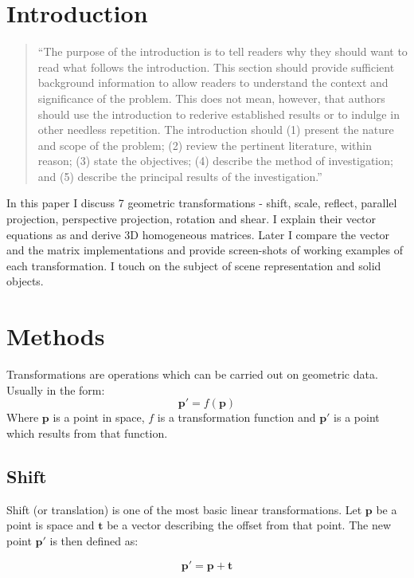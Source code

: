 \documentclass[]{report}   %
\begin{document}
\chapter{Introduction}		%


\begin{quotation}
	``The purpose of the introduction is to tell readers why they should want to read what follows the introduction.
	This section should provide sufficient background information to allow readers to understand the context and
	significance of the problem. This does not mean, however, that authors should use the introduction to rederive
	established results or to indulge in other needless repetition. The introduction should (1) present the nature
	and scope of the problem; (2) review the pertinent literature, within reason; (3) state the objectives; (4)
	describe the method of investigation; and (5) describe the principal results of the investigation.''
\end{quotation}


In this paper I discuss 7 geometric transformations - shift, scale, reflect, parallel projection, perspective projection, rotation and shear. I explain their vector equations as and derive 3D homogeneous matrices. Later I compare the vector and the matrix implementations and provide screen-shots of working examples of each transformation. I touch on the subject of scene representation and solid objects.





\chapter{Methods}           %


Transformations are operations which can be carried out on geometric data. Usually in the form:
\[
	\mathbf{p\prime} = f(\mathbf{p})
\]
Where \(\mathbf{p}\) is a point in space, \(f\) is a transformation function and \(\mathbf{p\prime}\) is a point which results from that function.


\section{Shift}

Shift (or translation) is one of the most basic linear transformations. Let \(\mathbf{p}\) be a point is space and \(\mathbf{t}\) be a vector describing the offset from that point. The new point \(\mathbf{p\prime}\) is then defined as:
\begin{mdframed}
\[
	\mathbf{p\prime} = \mathbf{p} + \mathbf{t}
\]
\end{mdframed}
\end{document}
